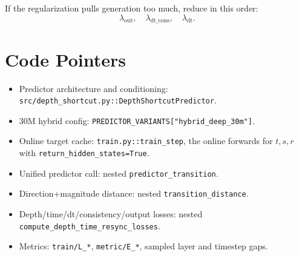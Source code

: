 \documentclass[11pt]{article}
\begin{document}
If the regularization pulls generation too much, reduce in this order:
\[
\lambda_{\mathrm{out}},\quad
\lambda_{\mathrm{dt\_cons}},\quad
\lambda_{\mathrm{dt}}.
\]

\section{Code Pointers}

\begin{itemize}[leftmargin=*]
  \item Predictor architecture and conditioning:
  \texttt{src/depth\_shortcut.py::DepthShortcutPredictor}.
  \item 30M hybrid config:
  \texttt{PREDICTOR\_VARIANTS["hybrid\_deep\_30m"]}.
  \item Online target cache:
  \texttt{train.py::train\_step}, the online forwards for $t,s,r$ with
  \texttt{return\_hidden\_states=True}.
  \item Unified predictor call:
  nested \texttt{predictor\_transition}.
  \item Direction+magnitude distance:
  nested \texttt{transition\_distance}.
  \item Depth/time/dt/consistency/output losses:
  nested \texttt{compute\_depth\_time\_resync\_losses}.
  \item Metrics:
  \texttt{train/L\_*}, \texttt{metric/E\_*}, sampled layer and timestep gaps.
\end{itemize}
\end{document}
